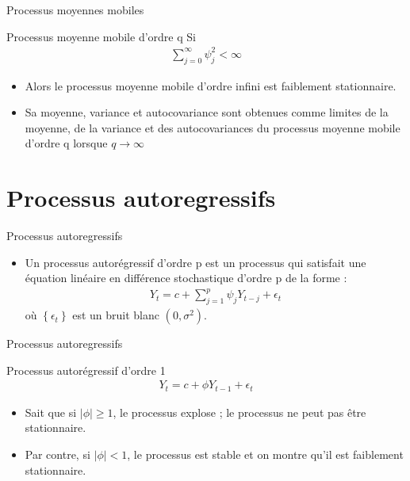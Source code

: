 \documentclass{beamer}
\begin{document}
\begin{frame}{Processus moyennes mobiles}
\begin{block}{Processus moyenne mobile d’ordre q}
Si
\begin{align*}
\sum_{j=0}^{\infty} \psi_j^2 <\infty
\end{align*}
\begin{itemize}
\item Alors le processus moyenne mobile d’ordre infini est faiblement stationnaire. 
\item Sa moyenne, variance et autocovariance sont obtenues comme limites de la moyenne, de la variance et des autocovariances du processus moyenne mobile d’ordre q lorsque $q \rightarrow \infty$
\end{itemize}
\end{block}
\end{frame}


\section{Processus autoregressifs}
\frame{\tableofcontents[current]}
\begin{frame}{Processus autoregressifs}
\begin{itemize}
\item Un processus autorégressif d’ordre p est un processus qui satisfait une équation linéaire en différence stochastique d’ordre p de la forme :
\begin{align*}
Y_t=c+\sum_{j=1}^p\psi_jY_{t-j}+\epsilon_t
\end{align*}
où $\left\{ \epsilon_t \right\}$ est un bruit blanc $(0,\sigma^2)$.
\end{itemize}
\end{frame}



\begin{frame}{Processus autoregressifs}
\begin{block}{Processus autorégressif d’ordre 1}
\begin{align*}
Y_t=c+\phi Y_{t-1}+\epsilon_t
\end{align*}
\begin{itemize}
\item Sait que si $\mid \phi \mid \ge 1$, le processus explose ; le processus ne peut pas être stationnaire. 
\item Par contre, si $\mid \phi \mid < 1$, le processus est stable et on montre qu’il est faiblement stationnaire.
\end{itemize}
\end{block}
\end{frame}
\end{document}
